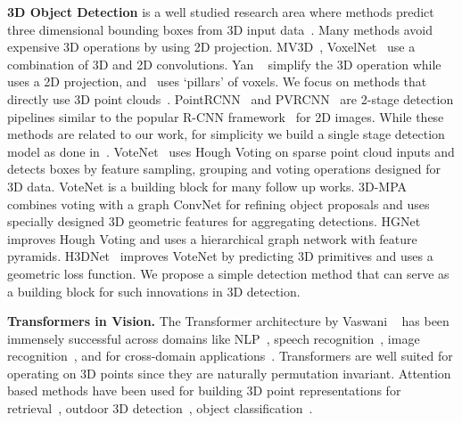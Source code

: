 \documentclass[10pt,twocolumn,letterpaper]{article}
\begin{document}
\par \noindent \textbf{3D Object Detection} is a well studied research area where methods predict three dimensional bounding boxes from 3D input data~\cite{qi2018frustum,pham2016geometrically,lahoud20193d,Song2014SlidingSF,Song_2016_CVPR,zhu2020ssn,simony2018complex,vora2020pointpainting,wang2015voting}.
Many methods avoid expensive 3D operations by using 2D projection.
MV3D~\cite{chen2017multi}, VoxelNet~\cite{zhou2018voxelnet} use a combination of 3D and 2D convolutions.
Yan \etal~\cite{yan2018second} simplify the 3D operation while~\cite{yang2018pixor} uses a 2D projection, and~\cite{wang2020pillar} uses `pillars' of voxels.
We focus on methods that directly use 3D point clouds~\cite{yi2019gspn,shi2019pointrcnn,pham2019jsis3d,wang2019associatively}.
PointRCNN~\cite{shi2019pointrcnn} and PVRCNN~\cite{shi2020pv} are 2-stage detection pipelines similar to the popular R-CNN framework~\cite{Ren15fasterrcnn} for 2D images.
While these methods are related to our work, for simplicity we build a single stage detection model as done in~\cite{qi2019votenet,yang20203dssd,engelmann20203d,gwak2020gsdn}.
VoteNet~\cite{qi2019votenet} uses Hough Voting on sparse point cloud inputs and detects boxes by feature sampling, grouping and voting operations designed for 3D data.
VoteNet is a building block for many follow up works.
3D-MPA~\cite{engelmann20203d} combines voting with a graph ConvNet for refining object proposals and uses specially designed 3D geometric features for aggregating detections.
HGNet~\cite{chen2020hierarchical} improves Hough Voting and uses a hierarchical graph network with feature pyramids.
H3DNet~\cite{zhang2020h3dnet} improves VoteNet by predicting 3D primitives and uses a geometric loss function.
We propose a simple detection method that can serve as a building block for such innovations in 3D detection.
\par \noindent \textbf{Transformers in Vision.} The Transformer architecture by Vaswani \etal~\cite{vaswani2017attention} has been immensely successful across domains like NLP~\cite{radford2018improving,devlin2018bert}, speech recognition~\cite{luscher2019rwth,synnaeve2019end}, image recognition~\cite{parmar2018image,carion2020end,wang2018non,hu2018relation,dosovitskiy2020image}, and for cross-domain applications~\cite{lu2019vilbert,su2019vl,tan2019lxmert}.
Transformers are well suited for operating on 3D points since they are naturally permutation invariant.
Attention based methods have been used for building 3D point representations for retrieval~\cite{zhang2019pcan}, outdoor 3D detection~\cite{liu2020tanet,yin2020lidar,paigwar2019attentional}, object classification~\cite{yang2019modeling}.
\end{document}
